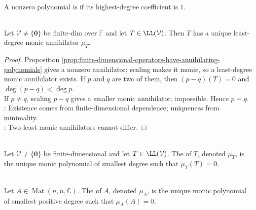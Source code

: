 \begin{definition} \label{def:monic-polynomial} \\
A nonzero polynomial is  if its highest-degree coefficient is $1$.
\end{definition}

\begin{theorem} \label{thm:operator-minimal-polynomial-existence} \\
Let $\mathcal{V}\neq\{\mathbf{0}\}$ be finite-dim over $\mathbb{F}$ and let $T\in\LL(\mathcal{V})$. Then $T$ has a unique least-degree monic annihilator $\mu_T$.
\begin{proof}
Proposition \ref{prop:finite-dimensional-operators-have-annihilating-polynomials} gives a nonzero annihilator; scaling makes it monic, so a least-degree monic annihilator exists. If $p$ and $q$ are two of them, then $(p-q)(T)=0$ and $\deg(p-q)<\deg p$.\\
If $p\neq q$, scaling $p-q$ gives a smaller monic annihilator, impossible. Hence $p=q$.\\
: Existence comes from finite-dimensional dependence; uniqueness from minimality.\\
: Two least monic annihilators cannot differ.
\end{proof}
\end{theorem}

\begin{definition} \label{def:operator-minimal-polynomial} \\
Let $\mathcal{V}\neq\{\mathbf{0}\}$ be finite-dimensional and let $T\in\LL(\mathcal{V})$. The  of $T$, denoted $\mu_T$, is the unique monic polynomial of smallest degree such that $\mu_T(T)=0$.
\end{definition}

\begin{definition} \label{def:minimal-polynomial-matrix} \\
Let $A\in\operatorname{Mat}(n,n,\mathbb{C})$. The  of $A$, denoted $\mu_A$, is the unique monic polynomial of smallest positive degree such that $\mu_A(A)=0$.
\end{definition}

